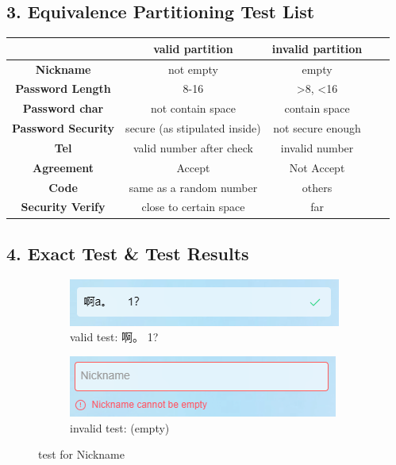\documentclass[11pt, oneside]{article}  %
\begin{document}
\subsection*{3. Equivalence Partitioning Test List}

\begin{table}[H]
    \centering
    \begin{tabular}{|c|c|c|c|c|}
        \hline
                                   & \textbf{valid partition}      & \textbf{invalid partition}      \\ \hline
        \textbf{Nickname}          & not empty                     & empty       \\ \hline
        \textbf{Password Length}   & 8-16                          & >8, <16    \\ \hline
        \textbf{Password char}     & not contain space             & contain space      \\ \hline
        \textbf{Password Security} & secure (as stipulated inside) & not secure enough       \\ \hline
        \textbf{Tel}               & valid number after check      & invalid number  \\ \hline
        \textbf{Agreement}         & Accept                        & Not Accept    \\ \hline
        \textbf{Code}              & same as a random number       & others \\ \hline
        \textbf{Security Verify}   & close to certain space        & far  \\ \hline
    \end{tabular}
\end{table}

\subsection*{4. Exact Test \& Test Results}

\begin{figure}[H]
    \centering
	\begin{subfigure}{0.4\linewidth}
		\includegraphics[width=1\linewidth]{./pic/3.3.1.png}
        \caption{valid test: 啊。     1?}
	\end{subfigure}
    \begin{subfigure}{0.4\linewidth}
		\includegraphics[width=1\linewidth]{./pic/3.3.2.png}
        \caption{invalid test: (empty)}
	\end{subfigure}
    \caption{test for Nickname}
\end{figure}
\end{document}
